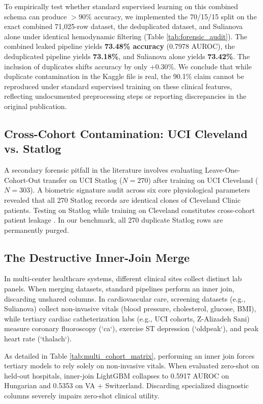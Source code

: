 \documentclass[journal]{IEEEtran}
\begin{document}
To empirically test whether standard supervised learning on this combined schema can produce $>90\%$ accuracy, we implemented the 70/15/15 split on the exact combined 71,025-row dataset, the deduplicated dataset, and Sulianova alone under identical hemodynamic filtering (Table \ref{tab:forensic_audit}). The combined leaked pipeline yields \textbf{73.48\% accuracy} (0.7978 AUROC), the deduplicated pipeline yields \textbf{73.18\%}, and Sulianova alone yields \textbf{73.42\%}. The inclusion of duplicates shifts accuracy by only $+0.30\%$. We conclude that while duplicate contamination in the Kaggle file is real, the 90.1\% claim cannot be reproduced under standard supervised training on these clinical features, reflecting undocumented preprocessing steps or reporting discrepancies in the original publication.

\subsection{Cross-Cohort Contamination: UCI Cleveland vs. Statlog}
A secondary forensic pitfall in the literature involves evaluating Leave-One-Cohort-Out transfer on UCI Statlog ($N=270$) after training on UCI Cleveland ($N=303$). A biometric signature audit across six core physiological parameters revealed that all 270 Statlog records are identical clones of Cleveland Clinic patients. Testing on Statlog while training on Cleveland constitutes cross-cohort patient leakage \cite{kapoor2023}. In our benchmark, all 270 duplicate Statlog rows are permanently purged.

\subsection{The Destructive Inner-Join Merge}
In multi-center healthcare systems, different clinical sites collect distinct lab panels. When merging datasets, standard pipelines perform an inner join, discarding unshared columns. In cardiovascular care, screening datasets (e.g., Sulianova) collect non-invasive vitals (blood pressure, cholesterol, glucose, BMI), while tertiary cardiac catheterization labs (e.g., UCI cohorts, Z-Alizadeh Sani) measure coronary fluoroscopy (`ca`), exercise ST depression (`oldpeak`), and peak heart rate (`thalach`).

As detailed in Table \ref{tab:multi_cohort_matrix}, performing an inner join forces tertiary models to rely solely on non-invasive vitals. When evaluated zero-shot on held-out hospitals, inner-join LightGBM collapses to 0.5917 AUROC on Hungarian and 0.5353 on VA + Switzerland. Discarding specialized diagnostic columns severely impairs zero-shot clinical utility.
\end{document}
